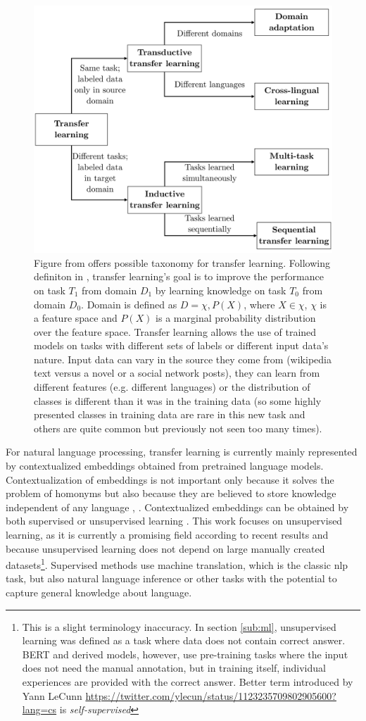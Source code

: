 \begin{figure}[ht]
\centering
\includegraphics[width=0.7\columnwidth]{../img/tl_taxonomy}
\caption{Figure from \protect\citep{Ruder2019} offers possible taxonomy for transfer learning. %
Following definiton in \citep{Pan2009}, transfer learning's goal is to improve the performance on task $T_1$ from domain $D_1$ by learning knowledge on task $T_0$ from domain $D_0$. Domain is defined as $D = {\chi,P(X)}$, where $X \in \chi$, $\chi$ is a feature space and $P(X)$ is a marginal probability distribution over the feature space. Transfer learning allows the use of trained models on tasks with different sets of labels or different input data's nature. Input data can vary in the source they come from (wikipedia text versus a novel or a social network posts), they can learn from different features (e.g. different languages) or the distribution of classes is different than it was in the training data (so some highly presented classes in training data are rare in this new task and others are quite common but previously not seen too many times).
}
\label{pic:tl_taxonomy}
\end{figure}
For natural language processing, transfer learning is currently mainly represented by contextualized embeddings obtained from pretrained language models.
Contextualization of embeddings is not important only because it solves the problem of homonyms but also because they are believed to store knowledge independent of any language \citep{Feijo2020}, \citep{Hewitt2020}. Contextualized embeddings can be obtained by both supervised or unsupervised learning \citep{Liu2020}. This work focuses on unsupervised learning, as it is currently a promising field according to recent results and because unsupervised learning does not depend on large manually created datasets\footnote{This is a slight terminology inaccuracy. In section \ref{sub:ml}, unsupervised learning was defined as a task where data does not contain correct answer. BERT and derived models, however, use pre-training tasks where the input does not need the manual annotation, but in training itself, individual experiences are provided with the correct answer. Better term introduced by Yann LeCunn \url{https://twitter.com/ylecun/status/1123235709802905600?lang=cs} is \textit{self-supervised}}. Supervised methods use machine translation, which is the classic \acrshort{nlp} task, but also natural language inference or other tasks with the potential to capture general knowledge about language.
